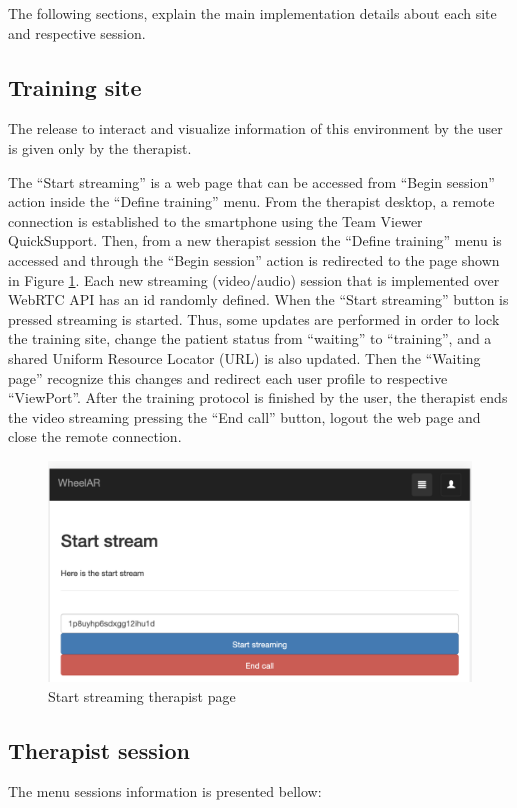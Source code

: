 The following sections, explain the main implementation details about each site and respective session.

\subsection{Training site}
\label{sec:impltrainingsite}

The release to interact and visualize information of this environment by the user is given only by the therapist. 

The ``Start streaming'' is a web page that can be accessed from ``Begin session'' action inside the ``Define training'' menu. From the therapist desktop, a remote connection is established to the smartphone using the Team Viewer QuickSupport. Then, from a new therapist session the ``Define training'' menu is accessed and through the  ``Begin session'' action is redirected to the page shown in Figure \ref{fig:apDtStartStream}. Each new streaming (video/audio) session that is implemented over WebRTC API has an id randomly defined. When the  ``Start streaming'' button is pressed streaming is started. Thus, some updates are performed in order to lock the training site, change the patient status from  ``waiting'' to  ``training'', and a shared Uniform Resource Locator (URL) is also updated. Then the  ``Waiting page'' recognize this changes and redirect each user profile to respective ``ViewPort''.  After the training protocol is finished by the user, the therapist ends the video streaming pressing the  ``End call'' button, logout the web page and close the remote connection.

\begin{figure}[!hbt]
\begin{center}
\includegraphics[width=0.5\linewidth]{img/apendiceD/tStartStream}
\caption{Start streaming therapist page} \label{fig:apDtStartStream}
\end{center}
\end{figure}

\subsection{Therapist session}
The menu sessions information is presented bellow:

